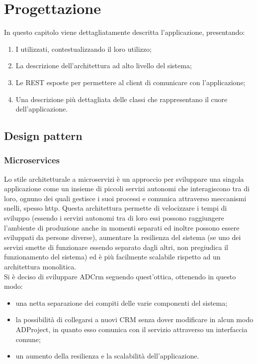 \documentclass[12pt,a4paper,twoside,openany,english]{book}
\begin{document}
\chapter{Progettazione}\label{progettazione}
In questo capitolo viene dettagliatamente descritta l'applicazione, presentando: 
\begin{enumerate}
	\itemsep-0.5em
	\item I  utilizzati, contestualizzando il loro utilizzo;
	\item La descrizione dell'architettura ad alto livello del sistema;
	\item Le  REST esposte per permettere al client di comunicare con l'applicazione;
	\item Una descrizione più dettagliata delle classi che rappresentano il cuore dell'applicazione.
\end{enumerate}

\section{Design pattern}\label{design_pattern}
\subsection{Microservices}
Lo stile architetturale a microservizi è un approccio per sviluppare una singola applicazione come un insieme di piccoli servizi autonomi che interagiscono tra di loro, ognuno dei quali gestisce i suoi processi e comunica attraverso meccanismi snelli, spesso  http.
Questa architettura permette di velocizzare i tempi di sviluppo (essendo i servizi autonomi tra di loro essi possono raggiungere l'ambiente di produzione anche in momenti separati ed inoltre possono essere sviluppati da persone diverse), aumentare la resilienza del sistema (se uno dei servizi smette di funzionare essendo separato dagli altri, non pregiudica il funzionamento del sistema) ed è più facilmente scalabile rispetto ad un architettura monolitica.\\
Si è deciso di sviluppare ADCrm seguendo quest'ottica, ottenendo in questo modo:
\begin{itemize}
	\itemsep-0.5em
	\item una netta separazione dei compiti delle varie componenti del sistema;
	\item la possibilità di collegarsi a nuovi CRM senza dover modificare in alcun modo ADProject, in quanto esso comunica con il servizio attraverso un interfaccia comune;
	\item un aumento  della resilienza e la scalabilità dell'applicazione.
\end{itemize}
\end{document}
